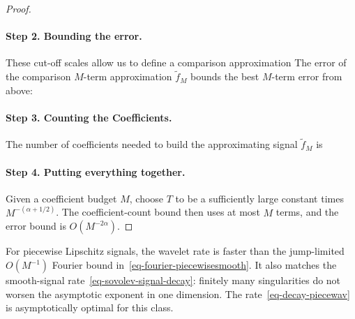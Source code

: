 \begin{proof}
\paragraph{Step 2. Bounding the error.}
These cut-off scales allow us to define a comparison approximation
The error of the comparison $M$-term approximation $\tilde f_M$ bounds the best $M$-term error from above:

\paragraph{Step 3. Counting the Coefficients.}
The number of coefficients needed to build the approximating signal $\tilde f_M$ is
\paragraph{Step 4. Putting everything together.}
Given a coefficient budget $M$, choose $T$ to be a sufficiently large constant times $M^{-(\alpha+1/2)}$. The coefficient-count bound then uses at most $M$ terms, and the error bound is $O(M^{-2\alpha})$.
\end{proof}

For piecewise Lipschitz signals, the wavelet rate is faster than the jump-limited $O(M^{-1})$ Fourier bound in~\eqref{eq-fourier-piecewisesmooth}. It also matches the smooth-signal rate~\eqref{eq-sovolev-signal-decay}: finitely many singularities do not worsen the asymptotic exponent in one dimension. The rate~\eqref{eq-decay-piecewav} is asymptotically optimal for this class.

